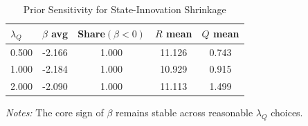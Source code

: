 \begin{table}[!htbp]
\centering
\begin{threeparttable}
 \caption{Prior Sensitivity for State-Innovation Shrinkage}
 \label{tab:prior_sensitivity}
\begin{tabular}{lcccc}
\toprule
$\lambda_Q$ & $\beta$ avg & Share$(\beta<0)$ & $R$ mean & $Q$ mean \\
\midrule
0.500 & -2.166 & 1.000 & 11.126 & 0.743 \\
1.000 & -2.184 & 1.000 & 10.929 & 0.915 \\
2.000 & -2.090 & 1.000 & 11.113 & 1.499 \\
\bottomrule
\end{tabular}
\begin{tablenotes}[flushleft]
\footnotesize
\item \textit{Notes:} The core sign of $\beta$ remains stable across reasonable $\lambda_Q$ choices.
\end{tablenotes}
\end{threeparttable}
\end{table}
